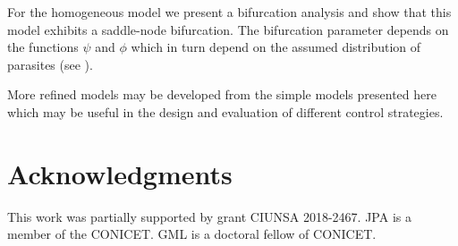 \documentclass[eng]{MMSB-class-eng}
\begin{document}
For the homogeneous model we present a bifurcation analysis and show that this model exhibits a saddle-node bifurcation.
The bifurcation parameter depends on the functions $\psi$ and $\phi$ which in turn depend on the assumed
distribution of parasites (see \citet{lopez2022general}).

More refined models may be developed from the simple models presented here which may be useful in the design and evaluation of different control strategies. 

\section{Acknowledgments}
This work was partially supported by grant CIUNSA 2018-2467. JPA is a member of the CONICET. GML is a doctoral fellow of CONICET.


\end{document}
